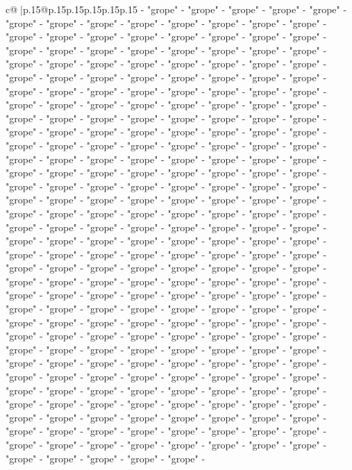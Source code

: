 \documentclass{article}
\begin{document}
{\begin{supertabular}{c@{$\;$}|p{.15\linewidth}@{}p{.15\linewidth}p{.15\linewidth}p{.15\linewidth}p{.15\linewidth}p{.15\linewidth}}
{{{{-} "grope" {-} "grope" {-} "grope" {-} "grope" {-} "grope" {-} "grope" {-} "grope" {-} "grope" {-} "grope" {-} "grope" {-} "grope" {-} "grope" {-} "grope" {-} "grope" {-} "grope" {-} "grope" {-} "grope" {-} "grope" {-} "grope" {-} "grope" {-} "grope" {-} "grope" {-} "grope" {-} "grope" {-} "grope" {-} "grope" {-} "grope" {-} "grope" {-} "grope" {-} "grope" {-} "grope" {-} "grope" {-} "grope" {-} "grope" {-} "grope" {-} "grope" {-} "grope" {-} "grope" {-} "grope" {-} "grope" {-} "grope" {-} "grope" {-} "grope" {-} "grope" {-} "grope" {-} "grope" {-} "grope" {-} "grope" {-} "grope" {-} "grope" {-} "grope" {-} "grope" {-} "grope" {-} "grope" {-} "grope" {-} "grope" {-} "grope" {-} "grope" {-} "grope" {-} "grope" {-} "grope" {-} "grope" {-} "grope" {-} "grope" {-} "grope" {-} "grope" {-} "grope" {-} "grope" {-} "grope" {-} "grope" {-} "grope" {-} "grope" {-} "grope" {-} "grope" {-} "grope" {-} "grope" {-} "grope" {-} "grope" {-} "grope" {-} "grope" {-} "grope" {-} "grope" {-} "grope" {-} "grope" {-} "grope" {-} "grope" {-} "grope" {-} "grope" {-} "grope" {-} "grope" {-} "grope" {-} "grope" {-} "grope" {-} "grope" {-} "grope" {-} "grope" {-} "grope" {-} "grope" {-} "grope" {-} "grope" {-} "grope" {-} "grope" {-} "grope" {-} "grope" {-} "grope" {-} "grope" {-} "grope" {-} "grope" {-} "grope" {-} "grope" {-} "grope" {-} "grope" {-} "grope" {-} "grope" {-} "grope" {-} "grope" {-} "grope" {-} "grope" {-} "grope" {-} "grope" {-} "grope" {-} "grope" {-} "grope" {-} "grope" {-} "grope" {-} "grope" {-} "grope" {-} "grope" {-} "grope" {-} "grope" {-} "grope" {-} "grope" {-} "grope" {-} "grope" {-} "grope" {-} "grope" {-} "grope" {-} "grope" {-} "grope" {-} "grope" {-} "grope" {-} "grope" {-} "grope" {-} "grope" {-} "grope" {-} "grope" {-} "grope" {-} "grope" {-} "grope" {-} "grope" {-} "grope" {-} "grope" {-} "grope" {-} "grope" {-} "grope" {-} "grope" {-} "grope" {-} "grope" {-} "grope" {-} "grope" {-} "grope" {-} "grope" {-} "grope" {-} "grope" {-} "grope" {-} "grope" {-} "grope" {-} "grope" {-} "grope" {-} "grope" {-} "grope" {-} "grope" {-} "grope" {-} "grope" {-} "grope" {-} "grope" {-} "grope" {-} "grope" {-} "grope" {-} "grope" {-} "grope" {-} "grope" {-} "grope" {-} "grope" {-} "grope" {-} "grope" {-} "grope" {-} "grope" {-} "grope" {-} "grope" {-} "grope" {-} "grope" {-} "grope" {-} "grope" {-} "grope" {-} "grope" {-} "grope" {-} "grope" {-} "grope" {-} "grope" {-} "grope" {-} "grope" {-} "grope" {-} "grope" {-} "grope" {-} "grope" {-} "grope" {-} "grope" {-} "grope" {-} "grope" {-} "grope" {-} "grope" {-} "grope" {-} "grope" {-} "grope" {-} "grope" {-} "grope" {-} "grope" {-} "grope" {-} "grope" {-} "grope" {-} "grope" {-} "grope" {-} "grope" {-} "grope" {-} "grope" {-} "grope" {-} "grope" {-} "grope" {-} "grope" {-} "grope" {-} "grope" {-} "grope" {-} "grope" {-} "grope" {-} "grope" {-} "grope" {-} "grope" {-} "grope" {-} "grope" {-} "grope" {-} "grope" {-} "grope" {-} "grope" {-} "grope" {-} "grope" {-} "grope" {-} "grope" {-} "grope" {-} "grope" {-} "grope" {-} "grope" {-} "grope" {-} "grope" {-} "grope" {-} "grope" {-} "grope" {-} "grope" {-} "grope" {-} "grope" {-} "grope" {-} "grope" {-} "grope" {-} "grope" {-} "grope" {-} "grope" {-} }}}
\end{supertabular}}
\end{document}
